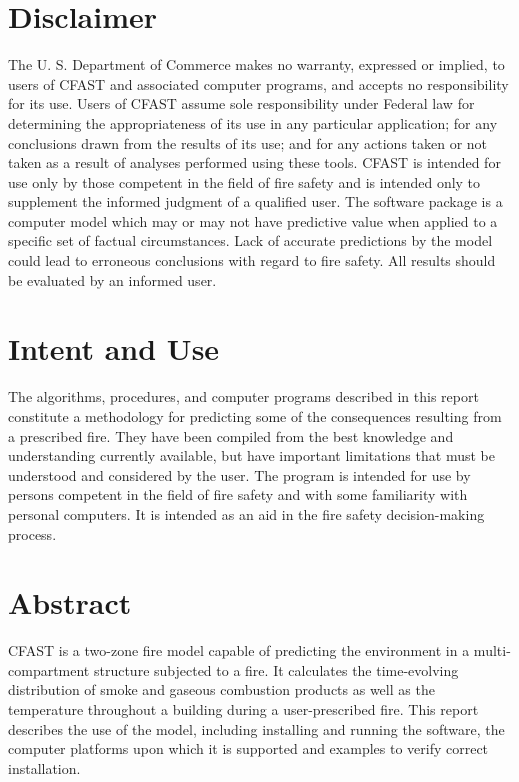 \documentclass[12pt]{book}
\begin{document}
\newpage

\frontmatter

\pagestyle{plain}
\setcounter{page}{3}

\chapter{Disclaimer}

The U. S. Department of Commerce makes no warranty, expressed or implied, to users of
CFAST and associated computer programs, and accepts no responsibility for its use.  Users of
CFAST assume sole responsibility under Federal law for determining the appropriateness of its
use in any particular application; for any conclusions drawn from the results of its use; and for
any actions taken or not taken as a result of analyses performed using these tools.
CFAST is intended for use only by those competent in the field of fire safety and is intended
only to supplement the informed judgment of a qualified user. The software package is a
computer model which may or may not have predictive value when applied to a specific set of
factual circumstances. Lack of accurate predictions by the model could lead to erroneous
conclusions with regard to fire safety. All results should be evaluated by an informed user.

\chapter{Intent and Use}

The algorithms, procedures, and computer programs described in this report constitute a
methodology for predicting some of the consequences resulting from a prescribed fire.  They
have been compiled from the best knowledge and understanding currently available, but have
important limitations that must be understood and considered by the user.  The program is
intended for use by persons competent in the field of fire safety and with some familiarity with
personal computers. It is intended as an aid in the fire safety decision-making process.

\chapter{Abstract}

CFAST is a two-zone fire model capable of predicting the environment in a multi-compartment structure subjected to a fire. It calculates the time-evolving distribution of smoke and gaseous combustion products as well as the temperature throughout a building during a user-prescribed fire. This report describes the use of the model, including installing and running the software, the computer platforms upon which it is supported and examples to verify correct installation.
\end{document}
